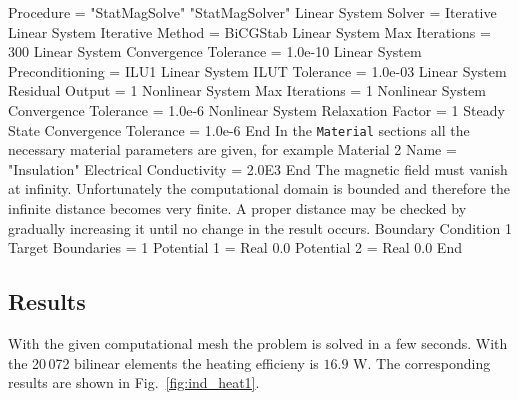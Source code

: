   Procedure = "StatMagSolve" "StatMagSolver"
  Linear System Solver = Iterative
  Linear System Iterative Method = BiCGStab
  Linear System Max Iterations = 300
  Linear System Convergence Tolerance = 1.0e-10
  Linear System Preconditioning = ILU1
  Linear System ILUT Tolerance = 1.0e-03
  Linear System Residual Output = 1
  Nonlinear System Max Iterations = 1
  Nonlinear System Convergence Tolerance = 1.0e-6
  Nonlinear System Relaxation Factor = 1
  Steady State Convergence Tolerance = 1.0e-6
End
\ttend
%
In the \texttt{Material} sections all the necessary 
material parameters are given, for example
\ttbegin
Material 2
  Name = "Insulation"
  Electrical Conductivity = 2.0E3
End
\ttend
%
The magnetic field must vanish at infinity. Unfortunately the
computational domain is bounded and therefore the infinite
distance becomes very finite. A proper distance may be checked
by gradually increasing it until no change in the result occurs.
%
\ttbegin
Boundary Condition 1
  Target Boundaries = 1
  Potential 1 = Real 0.0
  Potential 2 = Real 0.0
End
\ttend

\subsection*{Results}

With the given computational mesh the problem is solved in 
a few seconds. With the 20\,072 bilinear elements the heating
efficieny is $16.9$ W. The corresponding results are shown
in Fig.~\ref{fig:ind_heat1}.

